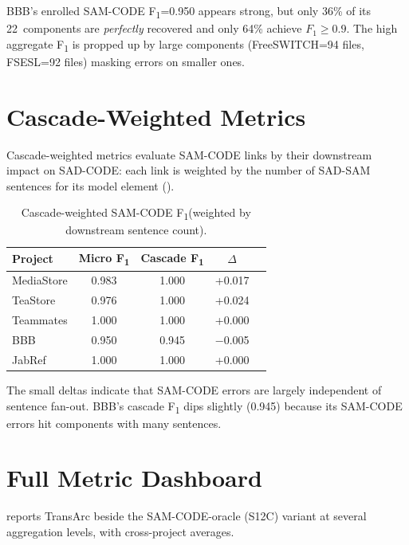 \documentclass[11pt,a4paper]{report}
\newcommand{\sadcode}{SAD-CODE\xspace}
\newcommand{\sadsam}{SAD-SAM\xspace}
\newcommand{\samcode}{SAM-CODE\xspace}
\newcommand{\transarc}{TransArc\xspace}
\newcommand{\fone}{F\textsubscript{1}\xspace}
\begin{document}
BBB's enrolled \samcode \fone=0.950 appears strong, but only 36\% of its
22~components are \emph{perfectly} recovered and only 64\% achieve
$F_1{\geq}0.9$. The high aggregate \fone is propped up by large components
(FreeSWITCH=94 files, FSESL=92 files) masking errors on smaller ones.


\section{Cascade-Weighted Metrics}
\label{sec:eval:cascade}

Cascade-weighted metrics evaluate \samcode links by their downstream impact on
\sadcode: each link is weighted by the number of \sadsam sentences for its
model element ().

\begin{table}[h]
\caption{Cascade-weighted \samcode \fone (weighted by downstream sentence count).}
\label{tab:cascade}
\centering\small
\begin{tabular}{lcccc}
\toprule
\textbf{Project} & \textbf{Micro \fone} & \textbf{Cascade \fone} & \textbf{$\Delta$} \\
\midrule
MediaStore  & 0.983 & 1.000 & +0.017 \\
TeaStore    & 0.976 & 1.000 & +0.024 \\
Teammates   & 1.000 & 1.000 & +0.000 \\
BBB         & 0.950 & 0.945 & $-$0.005 \\
JabRef      & 1.000 & 1.000 & +0.000 \\
\bottomrule
\end{tabular}
\end{table}

The small deltas indicate that \samcode errors are largely independent of
sentence fan-out. BBB's cascade \fone dips slightly (0.945) because its
\samcode errors hit components with many sentences.


\section{Full Metric Dashboard}

 reports \transarc beside the \samcode-oracle (S12C) variant at several aggregation levels, with cross-project averages.

\label{sec:eval:dashboard}
\end{document}
